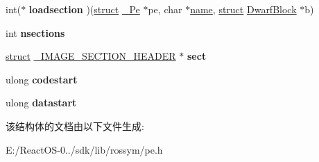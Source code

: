 \begin{DoxyCompactItemize}
int($\ast$ {\bfseries loadsection} )(\hyperlink{interfacestruct}{struct} \hyperlink{struct___pe}{\+\_\+\+Pe} $\ast$pe, char $\ast$\hyperlink{structname}{name}, \hyperlink{interfacestruct}{struct} \hyperlink{struct_dwarf_block}{Dwarf\+Block} $\ast$b)
\item 
\mbox{\label{struct___pe_afc45a6e59a5e386f6511f4c826d387b2}} 
int {\bfseries nsections}
\item 
\mbox{\label{struct___pe_a08ee5aaa518a996b17d7dd086b63ddcd}} 
\hyperlink{interfacestruct}{struct} \hyperlink{struct___i_m_a_g_e___s_e_c_t_i_o_n___h_e_a_d_e_r}{\+\_\+\+I\+M\+A\+G\+E\+\_\+\+S\+E\+C\+T\+I\+O\+N\+\_\+\+H\+E\+A\+D\+ER} $\ast$ {\bfseries sect}
\item 
\mbox{\label{struct___pe_a5dd0b941a13e45e75a505c49fd8b04d0}} 
ulong {\bfseries codestart}
\item 
\mbox{\label{struct___pe_adee1e848efdcdb67e415690be2969e64}} 
ulong {\bfseries datastart}
\end{DoxyCompactItemize}


该结构体的文档由以下文件生成\+:\begin{DoxyCompactItemize}
\item 
E\+:/\+React\+O\+S-\/0../sdk/lib/rossym/pe.\+h\end{DoxyCompactItemize}
